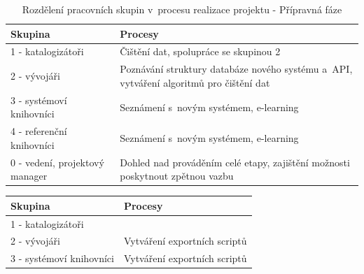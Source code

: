 \documentclass[
	11pt, oneside, printed, final, palatino, monochrome
	microtype,
	table,   %
	lof,     %
	lot     %
]{fithesis3}
\newcommand{\bold}[1]{\textbf{#1}}
\begin{document}
{\begin{table}
    \centering
    \begin{tabular}{| p{3cm} | p{8.3cm} |}
    \hline
    \bold{Skupina} 	
    & 
    \bold{Procesy} 
    \\ \hline
    
    1 - katalogizátoři 
    & 
    Čištění dat, spolupráce se skupinou 2 
    \\ \hline
    
    2 - vývojáři 
    & 
	Poznávání struktury databáze nového systému a~API, vytváření algoritmů pro čištění dat	
    \\ \hline
    
    3 - systémoví knihovníci
    & 
    Seznámení s~novým systémem, e-learning
    \\ \hline
    
    4 - referenční knihovníci
    & 
    Seznámení s~novým systémem, e-learning
    \\ \hline

	0 - vedení, projektový manager
    & 
    Dohled nad prováděním celé etapy, zajištění možnosti poskytnout zpětnou vazbu
    \\ \hline
    
    \end{tabular}
    \caption{Rozdělení pracovních skupin v~procesu realizace projektu - Přípravná fáze}
\end{table}
    
\begin{table}
    \centering
    \begin{tabular}{| p{3cm} | p{8.3cm} |}
    \hline
    \bold{Skupina} 	
    & 
    \bold{Procesy} 
    \\ \hline
    
	1 - katalogizátoři
    & 
    
    \\ \hline
    
	2 - vývojáři
    & 
    Vytváření exportních scriptů
    \\ \hline
    
	3 - systémoví knihovníci
    & 
    Vytváření exportních scriptů
    \\ \hline
    

\end{tabular}
\end{table}}
\end{document}

